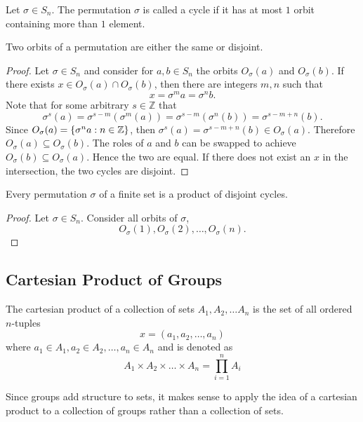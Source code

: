 \documentclass[../notes.tex]{subfiles}
\begin{document}
\begin{definition}
	Let $\sigma \in S_n$. The permutation $\sigma$ is called a cycle if it has at most $1$ orbit containing more than $1$ element.
\end{definition}

\begin{lemma}
	\label{lem:binaryorbit}
	Two orbits of a permutation are either the same or disjoint.
\end{lemma}
\begin{proof}
	Let $\sigma \in S_n$ and consider for $a,b \in S_n$ the orbits $O_\sigma(a)$ and $O_\sigma (b)$. If there exists $x \in O_\sigma(a) \cap O_\sigma(b)$, then there are integers $m,n$ such that
	\[
		x = \sigma^m a = \sigma^n b
	.\]
	Note that for some arbitrary $s \in \mathbb{Z}$ that
	\[
		\sigma^s (a) = \sigma^{s-m}(\sigma^m (a)) = \sigma^{s-m}(\sigma^n (b)) = \sigma^{s-m+n} (b)
	.\]
	Since $O_\sigma(a) = \qty{\sigma^n a : n \in \mathbb{Z}}$, then $\sigma^s(a) = \sigma^{s-m+n}(b) \in O_\sigma(a)$. Therefore $O_\sigma(a) \subseteq O_\sigma(b)$. The roles of $a$ and $b$ can be swapped to achieve $O_\sigma(b) \subseteq O_\sigma(a)$. Hence the two are equal. If there does not exist an $x$ in the intersection, the two cycles are disjoint.
\end{proof}

\begin{theorem}
	Every permutation $\sigma$ of a finite set is a product of disjoint cycles.
\end{theorem}
\begin{proof}
	Let $\sigma \in S_n$. Consider all orbits of $\sigma$,
	\[
		O_\sigma (1),O_\sigma (2), \ldots, O_\sigma (n)
	.\]

\end{proof}

\subsection{Cartesian Product of Groups}
\begin{definition}
	The cartesian product of a collection of sets $A_1, A_2, \ldots A_n$ is the set of all ordered $n$-tuples
	\[
		x = (a_1, a_2, \ldots, a_n)
	\]
	where $a_1 \in A_1, a_2 \in A_2, \ldots, a_n \in A_n$ and is denoted as
	\[
		A_1 \times A_2 \times \ldots \times A_n = \prod_{i=1}^n A_i
	\]
\end{definition}
Since groups add structure to sets, it makes sense to apply the idea of a cartesian product to a collection of groups rather than a collection of sets.
\end{document}
